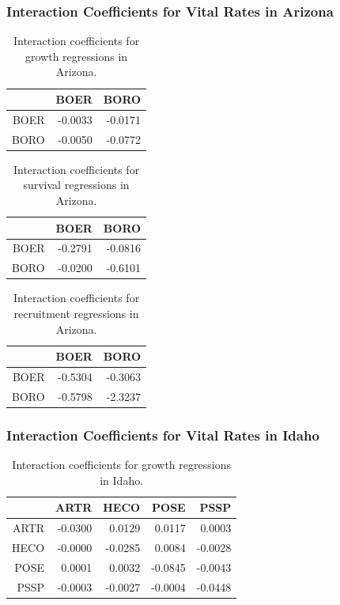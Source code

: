 \documentclass[12pt,]{article}
\begin{document}
\newpage{}

\subsubsection{Interaction Coefficients for Vital Rates in Arizona}

\begin{table}[ht]
\centering
\caption{Interaction coefficients for growth regressions in Arizona.} 
\begin{tabular}{rrr}
  \hline
 & BOER & BORO \\ 
  \hline
BOER & -0.0033 & -0.0171 \\ 
  BORO & -0.0050 & -0.0772 \\ 
   \hline
\end{tabular}
\end{table}

\begin{table}[ht]
\centering
\caption{Interaction coefficients for survival regressions in Arizona.} 
\begin{tabular}{rrr}
  \hline
 & BOER & BORO \\ 
  \hline
BOER & -0.2791 & -0.0816 \\ 
  BORO & -0.0200 & -0.6101 \\ 
   \hline
\end{tabular}
\end{table}

\begin{table}[ht]
\centering
\caption{Interaction coefficients for recruitment regressions in Arizona.} 
\begin{tabular}{rrr}
  \hline
 & BOER & BORO \\ 
  \hline
BOER & -0.5304 & -0.3063 \\ 
  BORO & -0.5798 & -2.3237 \\ 
   \hline
\end{tabular}
\end{table}

\newpage{}

\subsubsection{Interaction Coefficients for Vital Rates in Idaho}

\begin{table}[ht]
\centering
\caption{Interaction coefficients for growth regressions in Idaho.} 
\begin{tabular}{rrrrr}
  \hline
 & ARTR & HECO & POSE & PSSP \\ 
  \hline
ARTR & -0.0300 & 0.0129 & 0.0117 & 0.0003 \\ 
  HECO & -0.0000 & -0.0285 & 0.0084 & -0.0028 \\ 
  POSE & 0.0001 & 0.0032 & -0.0845 & -0.0043 \\ 
  PSSP & -0.0003 & -0.0027 & -0.0004 & -0.0448 \\ 
   \hline
\end{tabular}
\end{table}
\end{document}
